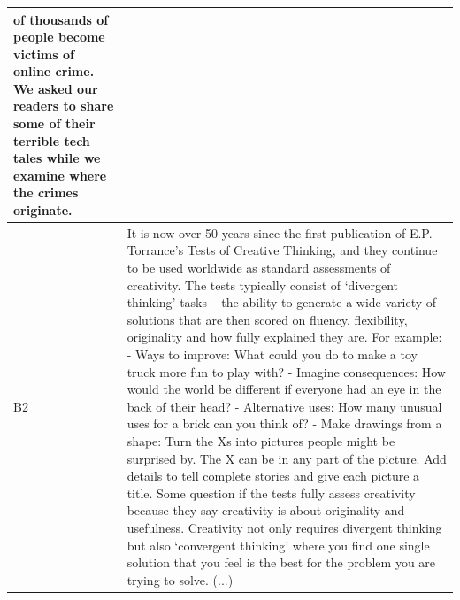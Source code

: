 \documentclass[11pt,a4paper]{article}
\begin{document}
\begin{longtable}{l|p{}}
  of thousands of people become victims of online crime. We asked our readers
  to share some of their terrible tech tales while we examine where the crimes
  originate.\\
  \midrule
  B2 & It is now over 50 years since the first publication of E.P. Torrance’s Tests of Creative Thinking, and they continue to be used worldwide as standard assessments of creativity.
  The tests typically consist of ‘divergent thinking’ tasks – the ability to
  generate a wide variety of solutions that are then scored on fluency,
  flexibility, originality and how fully explained they are. For example:\newline
  - Ways to improve: What could you do to make a toy truck more fun to play
  with?\newline
  - Imagine consequences: How would the world be different if everyone had an eye
  in the back of their head?\newline
  - Alternative uses: How many unusual uses for a brick can you think of?
  - Make drawings from a shape: Turn the Xs into pictures people might be
  surprised by. The X can be in any part of the picture. Add details to tell
  complete stories and give each picture a title.\newline
  Some question if the tests fully assess creativity because they say creativity is about originality and usefulness. Creativity not only requires divergent thinking but also ‘convergent thinking’ where you find one single solution that you feel is the best for the problem you are trying to solve.
  (...)\\

\end{longtable}
\end{document}
